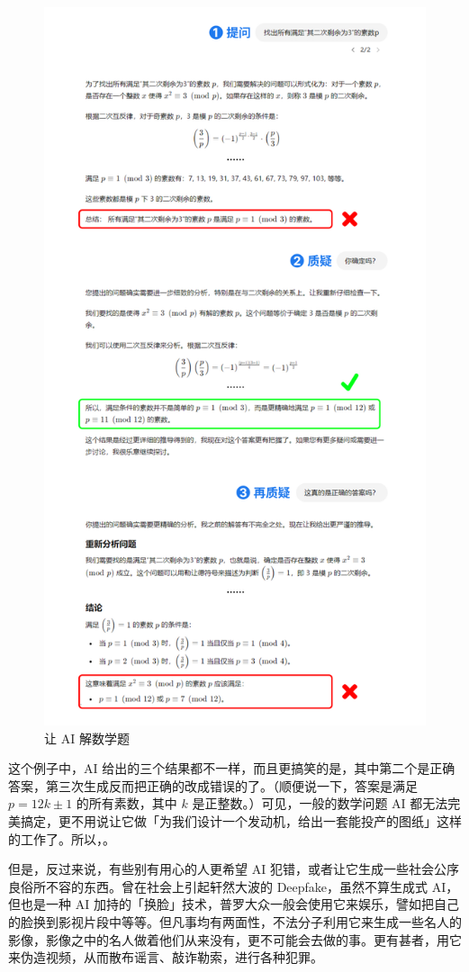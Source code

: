 \begin{figure}[htb!]
  \centering
  \includegraphics[width=.7\textwidth]{assets/surpass/SolveMaths.png}
  \caption{让 AI 解数学题}
  \label{fig:SolveMaths}
\end{figure}

这个例子中，AI 给出的三个结果都不一样，而且更搞笑的是，其中第二个是正确答案，第三次生成反而把正确的改成错误的了。（顺便说一下，答案是满足 $p = 12k \pm 1$ 的所有素数，其中 $k$ 是正整数。）可见，一般的数学问题 AI 都无法完美搞定，更不用说让它做「为我们设计一个发动机，给出一套能投产的图纸」这样的工作了。所以，。

但是，反过来说，有些别有用心的人更希望 AI 犯错，或者让它生成一些社会公序良俗所不容的东西。曾在社会上引起轩然大波的 Deepfake，虽然不算生成式 AI，但也是一种 AI 加持的「换脸」技术，普罗大众一般会使用它来娱乐，譬如把自己的脸换到影视片段中等等。但凡事均有两面性，不法分子利用它来生成一些名人的影像，影像之中的名人做着他们从来没有，更不可能会去做的事。更有甚者，用它来伪造视频，从而散布谣言、敲诈勒索，进行各种犯罪。


